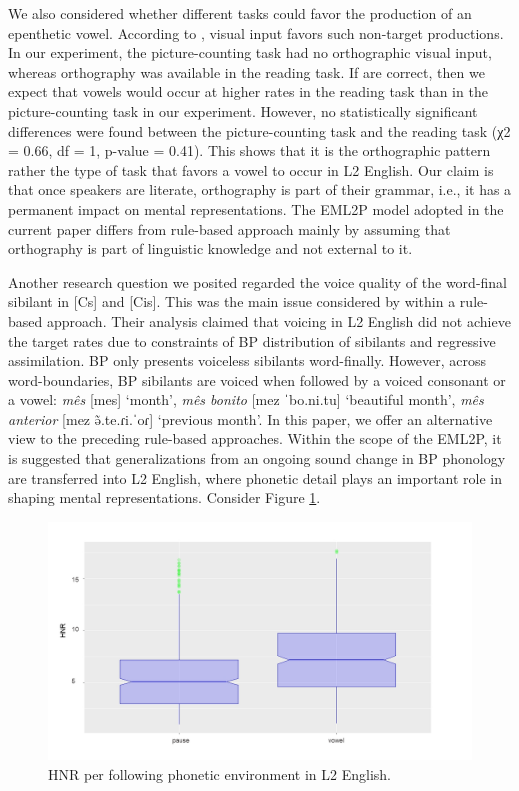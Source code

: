 We also considered whether different tasks could favor the production of
an epenthetic vowel. According to ,
visual input favors such non-target productions. In our experiment, the
picture-counting task had no orthographic visual input, whereas
orthography was available in the reading task. If  
are correct, then we expect that vowels would occur at
higher rates in the reading task than in the picture-counting task in
our experiment. However, no statistically significant differences were
found between the picture-counting task and the reading task (χ2 = 0.66,
df = 1, p-value = 0.41). This shows that it is the orthographic pattern
rather the type of task that favors a vowel to occur in L2 English. Our
claim is that once speakers are literate, orthography is part of their
grammar, i.e., it has a permanent impact on mental representations. The
EML2P model adopted in the current paper differs from 
rule-based approach mainly by
assuming that orthography is part of linguistic knowledge and not
external to it.

Another research question we posited regarded the voice quality of the
word-final sibilant in {[}Cs{]} and {[}Cis{]}. This was the main issue
considered by \citet{zanfra2013,fragozo2017} within a rule-based
approach. Their analysis claimed that voicing in L2 English did not
achieve the target rates due to constraints of BP distribution of
sibilants and regressive assimilation. BP only presents voiceless
sibilants word-finally. However, across word-boundaries, BP sibilants
are voiced when followed by a voiced consonant or a vowel: \emph{mês}
{[}mes{]} `month', \emph{mês bonito} {[}mez ˈbo.ni.tu{]} `beautiful
month', \emph{mês anterior} {[}mez ə̃.te.ɾi.ˈoɾ{]} `previous month'. In
this paper, we offer an alternative view to the preceding rule-based
approaches. Within the scope of the EML2P, it is suggested that
generalizations from an ongoing sound change in BP phonology are
transferred into L2 English, where phonetic detail plays an important
role in shaping mental representations. Consider Figure \ref{wel-fig2}.


\begin{figure}[h]
\centering
\includegraphics[width=\linewidth]{imgs/wellingfig02.png}
\caption{HNR per following phonetic environment in L2 English.}
\label{wel-fig2}
\end{figure}

